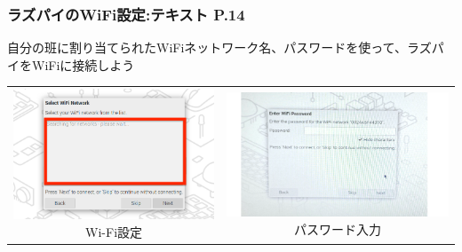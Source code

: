 \documentclass[dvipdfmx]{beamer}
\begin{document}
\begin{frame}[fragile]
	\frametitle{ラズパイのWiFi設定:テキスト P.14~~~}

	自分の班に割り当てられたWiFiネットワーク名、パスワードを使って、ラズパイをWiFiに接続しよう
	\vfill
	\begin{center}
	\begin{tabular}{cc}
		\begin{minipage}{0.32\textwidth}
                {\upshape
                  \includegraphics[width=\textwidth]{sw_image06kai.png}
                  \newline
                  Wi-Fi設定}
		\end{minipage}&
		\begin{minipage}{0.32\textwidth}
                          {\upshape
                            \includegraphics[width=\textwidth]{pswd_image_0404.png}
                            \newline
                            パスワード入力}
                        \end{minipage}

	\end{tabular}
	\end{center}


\end{frame}
\end{document}

